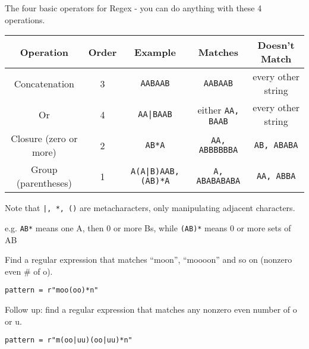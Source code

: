 The four basic operators for Regex - you can do anything with these 4 operations.
\begin{center}
\begin{tabular}{@{}ccccc@{}}
\toprule
    Operation & Order & Example & Matches & Doesn't Match \\
\midrule
    Concatenation & 3 & \texttt{AABAAB} & \texttt{AABAAB} & every other string \\
    Or & 4 & \texttt{AA|BAAB} & either \texttt{AA, BAAB} & every other string \\
    Closure (zero or more) & 2 & \texttt{AB*A} & \texttt{AA, ABBBBBBA} & \texttt{AB, ABABA} \\
    Group (parentheses) & 1 & \texttt{A(A|B)AAB, (AB)*A} & \texttt{A, ABABABABA} & \texttt{AA, ABBA} \\
\bottomrule
\end{tabular}
\end{center}
\begin{notebox}[]
Note that \texttt{|, *, ()} are metacharacters, only manipulating adjacent characters.

e.g. \texttt{AB*} means one A, then 0 or more Bs, while \texttt{(AB)*} means 0 or more sets of AB
\end{notebox}
\begin{example}[]{Find a regular expression that matches ``moon'', ``moooon'' and so on (nonzero even \# of o).
\tcbline 
\begin{verbatim}
pattern = r"moo(oo)*n"
\end{verbatim}
\tcbline
Follow up: find a regular expression that matches any nonzero even number of o or u.
\begin{verbatim}
pattern = r"m(oo|uu)(oo|uu)*n"
\end{verbatim}
}
\end{example}

